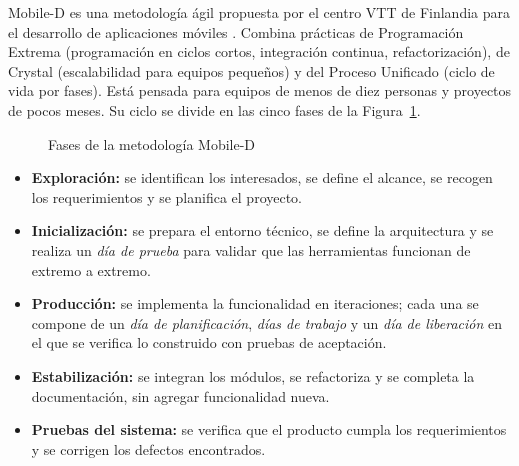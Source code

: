 Mobile-D es una metodología ágil propuesta por el centro VTT de Finlandia para
el desarrollo de aplicaciones móviles \citep{abrahamsson2004}. Combina
prácticas de Programación Extrema (programación en ciclos cortos, integración
continua, refactorización), de Crystal (escalabilidad para equipos pequeños) y
del Proceso Unificado (ciclo de vida por fases). Está pensada para equipos de
menos de diez personas y proyectos de pocos meses. Su ciclo se divide en las
cinco fases de la Figura~\ref{fig:mobiled}.

\begin{figure}[H]
\centering
{}
\caption{Fases de la metodología Mobile-D}
\label{fig:mobiled}
\end{figure}

\begin{itemize}
    \item \textbf{Exploración:} se identifican los interesados, se define el
    alcance, se recogen los requerimientos y se planifica el proyecto.
    \item \textbf{Inicialización:} se prepara el entorno técnico, se define la
    arquitectura y se realiza un \emph{día de prueba} para validar que las
    herramientas funcionan de extremo a extremo.
    \item \textbf{Producción:} se implementa la funcionalidad en iteraciones;
    cada una se compone de un \emph{día de planificación}, \emph{días de
    trabajo} y un \emph{día de liberación} en el que se verifica lo construido
    con pruebas de aceptación.
    \item \textbf{Estabilización:} se integran los módulos, se refactoriza y se
    completa la documentación, sin agregar funcionalidad nueva.
    \item \textbf{Pruebas del sistema:} se verifica que el producto cumpla los
    requerimientos y se corrigen los defectos encontrados.
\end{itemize}

